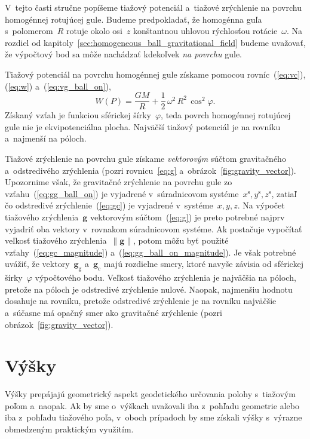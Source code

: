 \documentclass[a4paper, 12pt]{book}
\newcommand{\gidx}{\mathrm g}
\newcommand{\cidx}{\mathrm c}
\let\vec\mathbf
\begin{document}
V~tejto časti stručne popíšeme tiažový potenciál a~tiažové zrýchlenie na 
povrchu homogénnej rotujúcej gule.  Budeme predpokladať, že homogénna guľa 
s~polomerom~$R$ rotuje okolo osi~$z$ konštantnou uhlovou rýchlosťou 
rotácie~$\omega$.  Na rozdiel od 
kapitoly~\ref{sec:homogeneous_ball_gravitational_field} budeme uvažovať, že 
výpočtový bod sa môže nachádzať kdekoľvek \emph{na povrchu} gule.

Tiažový potenciál na povrchu homogénnej gule získame pomocou 
rovníc~(\ref{eq:vc}), (\ref{eq:w}) a~(\ref{eq:vg_ball_on}),
%
\begin{equation}
\label{eq:w_ball_on}
W(P) = \frac{GM}{R} + \frac{1}{2} \, \omega^2 \, R^2 \, \cos^2\varphi{.}
\end{equation}
%
Získaný vzťah je funkciou sférickej šírky~$\varphi$, teda povrch homogénnej 
rotujúcej gule nie je ekvipotenciálna plocha.  Najväčší tiažový potenciál je na 
rovníku a~najmenší na póloch.

Tiažové zrýchlenie na povrchu gule získame \emph{vektorovým} súčtom 
gravitačného a~odstredivého zrýchlenia (pozri rovnicu~\ref{eq:g} 
a~obrázok~\ref{fig:gravity_vector}).  Upozornime však, že gravitačné zrýchlenie 
na povrchu gule zo vzťahu~(\ref{eq:gg_ball_on}) je vyjadrené v~súradnicovom 
systéme~$x^\mathrm{s}, y^\mathrm{s}, z^\mathrm{s}$, zatiaľ čo odstredivé 
zrýchlenie~(\ref{eq:gc}) je vyjadrené v~systéme~$x, y, z$.  Na výpočet 
tiažového zrýchlenia~$\vec g$ vektorovým súčtom~(\ref{eq:g}) je preto potrebné 
najprv vyjadriť oba vektory v~rovnakom súradnicovom systéme.  Ak postačuje 
vypočítať veľkosť tiažového zrýchlenia~$\| \vec g \|$, potom môžu byť použité 
vzťahy~(\ref{eq:gc_magnitude}) a~(\ref{eq:gg_ball_on_magnitude}).  Je však 
potrebné uvážiť, že vektory~$\vec g_\gidx$ a~$\vec g_\cidx$ majú rozdielne 
smery, ktoré navyše závisia od sférickej šírky~$\varphi$ výpočtového bodu.  
Veľkosť tiažového zrýchlenia je najväčšia na póloch, pretože na póloch je 
odstredivé zrýchlenie nulové.  Naopak, najmenšiu hodnotu dosahuje na rovníku, 
pretože odstredivé zrýchlenie je na rovníku najväčšie a~súčasne má opačný smer 
ako gravitačné zrýchlenie (pozri obrázok~\ref{fig:gravity_vector}).

\section{Výšky}
\label{sec:heights}

Výšky prepájajú geometrický aspekt geodetického určovania polohy s~tiažovým 
poľom a~naopak.  Ak by sme o~výškach uvažovali iba z~pohľadu geometrie alebo 
iba z~pohľadu tiažového poľa, v~oboch prípadoch by sme získali výšky s~výrazne 
obmedzeným praktickým využitím.
\end{document}
